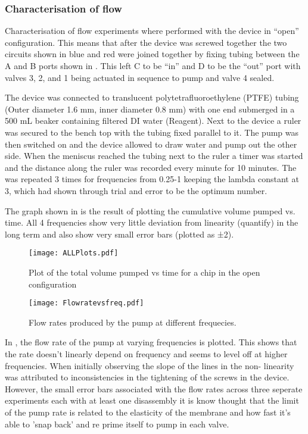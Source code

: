 \subsubsection{Characterisation of flow}

Characterisation of flow experiments where performed with the device in “open”
configuration. This means that after the device was screwed together the two circuits shown
in blue and red were joined together by fixing tubing between the A and B ports shown in
. This left C to be “in” and D to be the “out” port with valves 3, 2, and 1
being actuated in sequence to pump and valve 4 sealed.

The device was connected to translucent polytetrafluoroethylene (PTFE) tubing (Outer
diameter 1.6 mm, inner diameter 0.8 mm) with one end submerged in a 500 mL beaker
containing filtered DI water (Reagent). Next to the device a ruler was secured to the bench
top with the tubing fixed parallel to it. The pump was then switched on and the device
allowed to draw water and pump out the other side. When the meniscus reached the tubing
next to the ruler a timer was started and the distance along the ruler was recorded every
minute for 10 minutes. The was repeated 3 times for frequencies from 0.25-1 keeping the
lambda constant at 3, which had shown through trial and error to be the optimum number.

The graph shown in  is the result of plotting the cumulative volume pumped
vs. time. All 4 frequencies show very little deviation from linearity (quantify) in the
long term and also show very small error bars (plotted as ±2\sigma).

\begin{figure}
  \begin{center}
  \texttt{[image: ALLPlots.pdf]}
  \caption{Plot of the total volume pumped vs time for a chip in the open
  configuration}
  \label{fig:Graph}
  \end{center}
\end{figure}

\begin{figure}
  \begin{center}
  \texttt{[image: Flowratevsfreq.pdf]}
  \caption{Flow rates produced by the pump at different frequecies.}
  \label{fig:FRvFGraph}
  \end{center}
\end{figure}

In , the flow rate of the pump at varying frequencies is plotted. This
shows that the rate doesn't linearly depend on frequency and seems to level off at higher
frequencies. When initially observing the slope of the lines in  the non-
linearity was attributed to inconsistencies in the tightening of the screws in the device.
However, the small error bars associated with the flow rates across three seperate
experiments each with at least one disassembly it is know thought that the limit of the
pump rate is related to the elasticity of the membrane and how fast it's able to 'snap
back' and re prime itself to pump in each valve.

